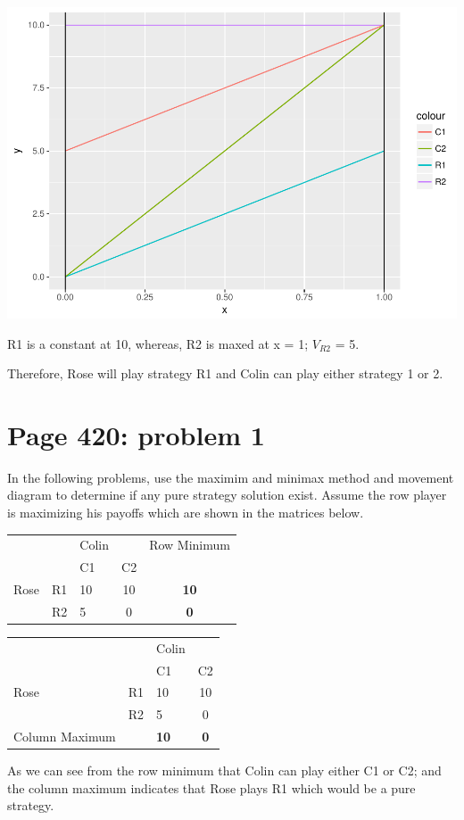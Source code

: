 \documentclass[]{article}
\begin{document}
\includegraphics{Christophe_Hunt_hw9_files/figure-latex/unnamed-chunk-5-1.pdf}

R1 is a constant at 10, whereas, R2 is maxed at x = 1; \(V_{R2}\) = 5.

Therefore, Rose will play strategy R1 and Colin can play either strategy
1 or 2.

\section{Page 420: problem 1}\label{page-420-problem-1}

In the following problems, use the maximim and minimax method and
movement diagram to determine if any pure strategy solution exist.
Assume the row player is maximizing his payoffs which are shown in the
matrices below.

\begin{table}[h]
    \begin{tabular}{lllcc}
    ~    & ~  & Colin & ~  & Row Minimum  \\
    ~    & ~  & C1    & C2 & ~            \\
    Rose & R1 & 10    & 10 & \textbf{10}   \\
    ~    & R2 & 5     & 0  & \textbf{0}   \\ \hline
    \end{tabular}
\end{table}

\begin{table}[h]
    \begin{tabular}{lllc}
    ~    & ~  & Colin & ~   \\
    ~    & ~  & C1    & C2  \\
    Rose & R1 & 10    & 10  \\
    ~    & R2 & 5     & 0     \\ 
    Column Maximum  & & \textbf{10} & \textbf{0}
    \\ \hline
    \end{tabular}
\end{table}

As we can see from the row minimum that Colin can play either C1 or C2;
and the column maximum indicates that Rose plays R1 which would be a
pure strategy.
\end{document}
